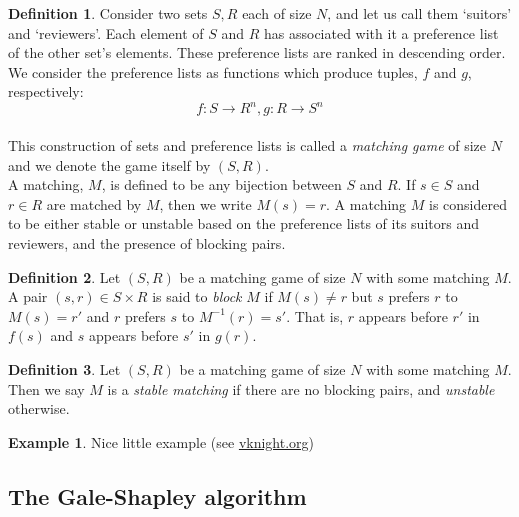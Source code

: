 \documentclass{article}
\theoremstyle{definition}
\newtheorem{definition}{Definition}[section]
\newtheorem{example}{Example}
\begin{document}
\begin{definition}\label{def:matching-game}
    Consider two sets \(S, R\) each of size \(N\), and let us call them 
    `suitors' and `reviewers'. Each element of \(S\) and \(R\) has associated 
    with it a preference list of the other set's elements. These preference 
    lists are ranked in descending order. We consider the preference lists as 
    functions which produce tuples, \(f\) and \(g\), respectively:
	\[
	    f : S \to R^n, g : R \to S^n
	\]\\

	This construction of sets and preference lists is called a 
    \emph{matching game} of size \(N\) and we denote the game itself by 
    \((S,R)\).\\
	
    A matching, \(M\), is defined to be any bijection between \(S\) and \(R\). 
    If \(s \in S\) and \(r \in R\) are matched by \(M\), then we write \(M(s) = 
    r\). A matching \(M\) is considered to be either stable or unstable based on
    the preference lists of its suitors and reviewers, and the presence of 
    blocking pairs.
\end{definition}

\begin{definition}\label{def:blocking-pair}
    Let \((S, R)\) be a matching game of size \(N\) with some matching \(M\). A 
    pair \((s, r) \in S \times R\) is said to \emph{block} \(M\) if \(M(s) \ne
    r\) but \(s\) prefers \(r\) to \(M(s) = r'\) and \(r\) prefers \(s\) to
    \(M^{-1}(r) = s'\). That is, \(r\) appears before \(r'\) in \(f(s)\) and
    \(s\) appears before \(s'\) in \(g(r)\).
\end{definition}

\begin{definition}\label{def:stable-matching}
    Let \((S, R)\) be a matching game of size \(N\) with some matching \(M\). 
    Then we say \(M\) is a \emph{stable matching} if there are no blocking 
    pairs, and \emph{unstable} otherwise.
\end{definition}

\begin{example}\label{example:matching}
    Nice little example (see \url{vknight.org})
\end{example}

\subsection{The Gale-Shapley algorithm}\label{subsection:galeshapley}
\end{document}
